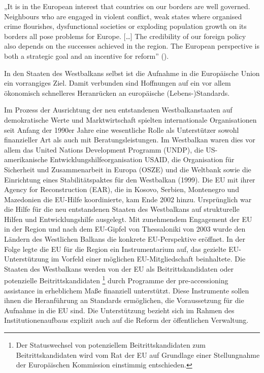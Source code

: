 „It is in the European interest that countries on our borders are well governed. Neighbours who are engaged in violent conflict, weak states where organised crime flourishes, dysfunctional societies or exploding population growth on its borders all pose problems for Europe. […] The credibility of our foreign policy also depends on the successes achieved in the region. The European perspective is both a strategic goal and an incentive for reform” (\cite{solana}).\par

In den Staaten des Westbalkans selbst ist die Aufnahme in die Europäische Union ein vorrangiges Ziel. Damit verbunden sind Hoffnungen auf ein vor allem ökonomisch schnelleres Heranrücken an europäische (Lebens-)Standards.\par

Im Prozess der Ausrichtung der neu entstandenen Westbalkanstaaten auf demokratische Werte und Marktwirtschaft spielten internationale Organisationen seit Anfang der 1990er Jahre eine wesentliche Rolle als Unterstützer sowohl finanzieller Art als auch mit Beratungsleistungen. Im Westbalkan waren dies vor allem das United Nations Development Programm (UNDP), die US-amerikanische Entwicklungshilfeorganisation USAID, die Organisation für Sicherheit und Zusammenarbeit in Europa (OSZE) und die Weltbank sowie die Einrichtung eines Stabilitätspaktes für den Westbalkan (1999). Die EU mit ihrer Agency for Reconstruction (EAR), die in Kosovo, Serbien, Montenegro und Mazedonien die EU-Hilfe koordinierte, kam Ende 2002 hinzu. Ursprünglich war die Hilfe für die neu entstandenen Staaten des Westbalkans auf strukturelle Hilfen und Entwicklungshilfe ausgelegt. Mit zunehmendem Engagement der EU in der Region und nach dem EU-Gipfel von Thessaloniki von 2003 wurde den Ländern des Westlichen Balkans die konkrete EU-Perspektive eröffnet. In der Folge legte die EU für die Region ein Instrumentarium auf, das gezielte EU-Unterstützung im Vorfeld einer möglichen EU-Mitgliedschaft beinhaltete. Die Staaten des Westbalkans werden von der EU als Beitrittskandidaten oder potenzielle Beitrittskandidaten \footnote{Der Statuswechsel von potenziellem Beitrittskandidaten zum Beitrittskandidaten wird vom Rat der EU auf Grundlage einer Stellungnahme der Europäischen Kommission einstimmig entschieden.} durch Programme der pre-accessioning assistance in erheblichem Maße finanziell unterstützt. Diese Instrumente sollen ihnen die Heranführung an Standards ermöglichen, die Voraussetzung für die Aufnahme in die EU sind. Die Unterstützung bezieht sich im Rahmen des Institutionenaufbaus explizit auch auf die Reform der öffentlichen Verwaltung.
